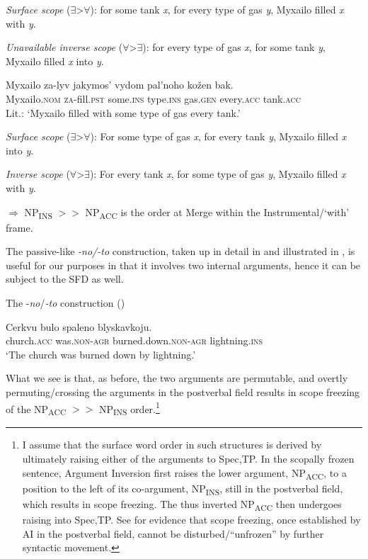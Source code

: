 \documentclass[output=paper,colorlinks,citecolor=brown]{langscibook}
\begin{document}
\textit{Surface scope} (${\exists}$>${\forall}$):  for some tank \textit{x}, for every type of gas \textit{y}, Myxailo filled \textit{x} with \textit{y}.

\textit{Unavailable inverse scope} (${\forall}$>${\exists}$):  for every type of gas \textit{x}, for some tank \textit{y}, Myxailo filled \textit{x} into \textit{y}.

\ex
\gll   Myxailo   za-lyv     jakymos’ vydom pal’noho     kožen bak.\\
  Myxailo.\textsc{nom}   \textsc{za}-fill.\textsc{pst}  some.\textsc{ins} type.\textsc{ins} gas.\textsc{gen}     every.\textsc{acc} tank.\textsc{acc}\\
  \glt Lit.: ‘Myxailo filled with some type of gas every tank.’

\textit{Surface scope} (${\exists}$>${\forall}$): For some type of gas \textit{x}, for every tank \textit{y}, Myxailo filled \textit{x} into \textit{y}.

\textit{Inverse scope }(${\forall}$>${\exists}$): For every tank \textit{x}, for some type of gas \textit{y}, Myxailo filled \textit{x} with \textit{y}.
    

\z
$\Rightarrow$ NP\textsubscript{INS} $>>$ NP\textsubscript{ACC} is the order at Merge within the Instrumental/`with' frame.
\z


\noindent The passive-like \textit{-no/-to} construction, taken up in detail in \citet{Lavine2022, Lavine2023} and illustrated in , is useful for our purposes in that it involves two internal arguments, hence it can be subject to the SFD as well. 

\ea%
\label{ex:antonyuk:23}
    The -\textit{no}/\textit{{}-to} construction (\citealt{LavineFreidin2002})
    
\gll   Cerkvu   bulo spaleno     blyskavkoju.    \\
  church.\textsc{acc}  was.\textsc{non-agr} burned.down.\textsc{non-agr}  lightning.\textsc{ins}\\
\glt `The church was burned down by lightning.’\label{ex:noto}
    \z

\noindent What we see is that, as before, the two arguments are permutable, and overtly permuting/crossing the arguments in the postverbal field results in scope freezing of the NP\textsubscript{ACC} $>>$ NP\textsubscript{INS} order.\footnote{\label{ft:antonyuk:15}\textrm{I assume that the surface word order in such structures is derived by ultimately raising either of the arguments to Spec,TP. In the scopally frozen sentence, Argument Inversion first raises the lower argument, NP}\textrm{\textsubscript{ACC}}\textrm{, to a position to the left of its co-argument, NP}\textrm{\textsubscript{INS}}\textrm{, still in the postverbal field, which results in scope freezing. The thus inverted NP}\textrm{\textsubscript{ACC} }\textrm{then undergoes raising into Spec,TP. See \citet{AntonyukMykhaylyk2022} for evidence that scope freezing, once established by AI in the postverbal field, cannot be disturbed/“unfrozen” by further syntactic movement.}}
\end{document}

